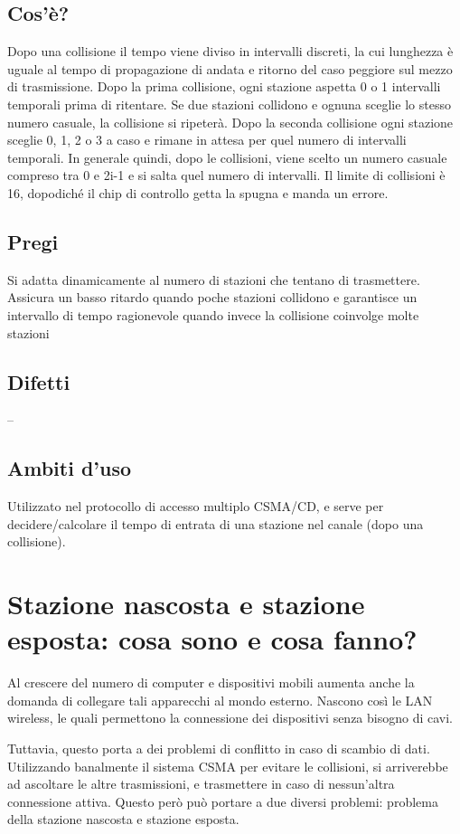 \subsection{Cos'è?}
Dopo una collisione il tempo viene diviso in intervalli discreti, la cui lunghezza è uguale al tempo di propagazione di andata e ritorno del caso peggiore sul mezzo di trasmissione.
Dopo la prima collisione, ogni stazione aspetta 0 o 1 intervalli temporali prima di ritentare. Se due stazioni collidono e ognuna sceglie lo stesso numero casuale, la collisione si ripeterà. Dopo la seconda collisione ogni stazione sceglie 0, 1, 2 o 3 a caso e rimane in attesa per quel numero di intervalli temporali. In generale quindi, dopo le collisioni, viene scelto un numero casuale compreso tra 0 e 2i-1 e si salta quel numero di intervalli. Il limite di collisioni è 16, dopodiché il chip di controllo getta la spugna e manda un errore.

\subsection{Pregi}
Si adatta dinamicamente al numero di stazioni che tentano di trasmettere.\\
Assicura un basso ritardo quando poche stazioni collidono e garantisce un intervallo di tempo ragionevole quando invece la collisione coinvolge molte stazioni

\subsection{Difetti}
--

\subsection{Ambiti d'uso}
Utilizzato nel protocollo di accesso multiplo CSMA/CD, e serve per decidere/calcolare il tempo di entrata di una stazione nel canale (dopo una collisione).
\section{Stazione nascosta e stazione esposta: cosa sono e cosa fanno?}

Al crescere del numero di computer e dispositivi mobili aumenta anche la domanda di collegare tali apparecchi al mondo esterno.
Nascono così le LAN wireless, le quali permettono la connessione dei dispositivi senza bisogno di cavi.

Tuttavia, questo porta a dei problemi di conflitto in caso di scambio di dati.
Utilizzando banalmente il sistema CSMA per evitare le collisioni, si arriverebbe ad ascoltare le altre trasmissioni, e trasmettere in caso di nessun’altra connessione attiva.
Questo però può portare a due diversi problemi: problema della stazione nascosta e stazione esposta.
